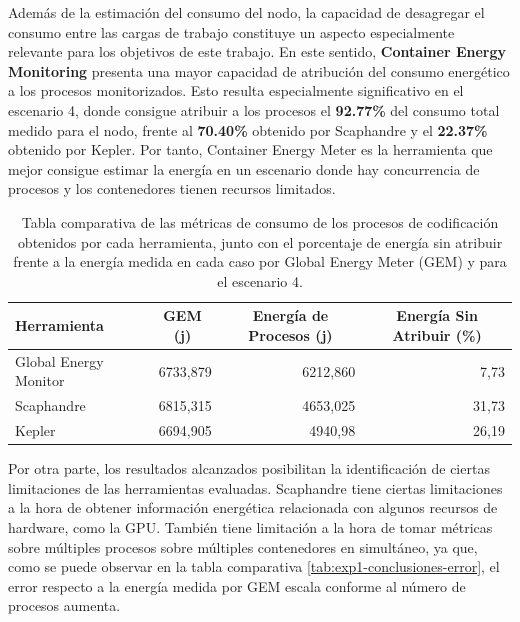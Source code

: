 Además de la estimación del consumo del nodo, la capacidad de desagregar el consumo entre las cargas de trabajo constituye un aspecto especialmente relevante para los objetivos de este trabajo. En este sentido, \textbf{Container Energy Monitoring} presenta una mayor capacidad de atribución del consumo energético a los procesos monitorizados. Esto resulta especialmente significativo en el escenario 4, donde consigue atribuir a los procesos el \textbf{92.77\%} del consumo total medido para el nodo, frente al \textbf{70.40\%} obtenido por Scaphandre y el \textbf{22.37\%} obtenido por Kepler. Por tanto, Container Energy Meter es la herramienta que mejor consigue estimar la energía en un escenario donde hay concurrencia de procesos y los contenedores tienen recursos limitados.

\begin{table}[htbp]

     \centering

     \begin{tabularx}{\textwidth}{|>{\raggedright\arraybackslash}X|r|r|r|}

     \hline

     \rowcolor[HTML]{C0C0C0} 

     Herramienta & \multicolumn{1}{c|}{GEM (j)} & \multicolumn{1}{c|}{Energía de Procesos (j)} & \multicolumn{1}{c|}{Energía Sin Atribuir (\%)} \\ \hline

     Global Energy Monitor & 6733,879 & 6212,860 & 7,73 \\ \hline

     Scaphandre & 6815,315 & 4653,025 & 31,73 \\ \hline

     Kepler & 6694,905 & 4940,98 & 26,19 \\ \hline

     \end{tabularx}

     \caption{Tabla comparativa de las métricas de consumo de los procesos de codificación obtenidos por cada herramienta, junto con el porcentaje de energía sin atribuir frente a la energía medida en cada caso por Global Energy Meter (GEM) y para el escenario 4.}

     \label{tab:exp1-conclusiones-esc4}

\end{table}

Por otra parte, los resultados alcanzados posibilitan la identificación de ciertas limitaciones de las herramientas evaluadas. Scaphandre tiene ciertas limitaciones a la hora de obtener información energética relacionada con algunos recursos de hardware, como la GPU. También tiene limitación a la hora de tomar métricas sobre múltiples procesos sobre múltiples contenedores en simultáneo, ya que, como se puede observar en la tabla comparativa \ref{tab:exp1-conclusiones-error}, el error respecto a la energía medida por GEM escala conforme al número de procesos aumenta.  

